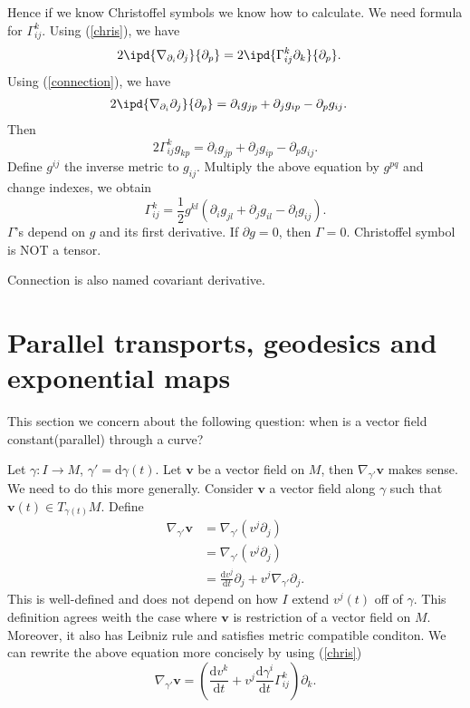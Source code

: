 Hence if we know Christoffel symbols we know how to calculate. We need formula for $\Gamma^k_{ij}$. Using (\ref{chris}), we have
\begin{align*}
  2\ipd{\nabla _{\partial_i}\partial_j}{\partial_p}&=2\ipd{\Gamma^k_{ij}\partial_k}{\partial_p}
.\end{align*}
Using (\ref{connection}), we have
\begin{align*}
  2\ipd{\nabla _{\partial_i}\partial_j}{\partial_p}&= \partial_i g_{jp}+\partial_j g_{ip}-\partial_p g_{ij}
.\end{align*}
Then
\[
2\Gamma_{ij}^{k} g_{kp}=\partial_{i}g_{jp}+\partial_{j}g_{ip}-\partial_pg_{ij}.
\] 
Define $g^{ij}$ the inverse metric to $g_{ij}$. Multiply the above equation by $g^{pq}$ and change indexes, we obtain
\begin{equation}
  \Gamma_{ij}^{k}=\frac{1}{2}g^{kl}\left( \partial_i g_{jl}+\partial_jg_{il}-\partial_l g_{ij} \right). 
\end{equation}
$\Gamma$'s depend on $g$ and its first derivative. If $\partial g=0$, then $\Gamma=0$.
Christoffel symbol is NOT a tensor.

Connection is also named covariant derivative.

\section{Parallel transports, geodesics and exponential maps}
This section we concern about the following question: when is a vector field constant(parallel) through a curve?

Let $\gamma:I\to M$, $\gamma'=\mathrm{d}\gamma(t)$. Let $\mathbf{v}$ be a vector field on $M$, then $\nabla _{\gamma'}\mathbf{v}$ makes sense. We need to do this more generally. Consider $\mathbf{v}$ a vector field along $\gamma$ such that $\mathbf{v}(t)\in T_{\gamma(t)}M$. Define 
\begin{align*}
  \nabla _{\gamma'}\mathbf{v}&= \nabla _{\gamma'}\left( v^j\partial_j \right) \\
  &= \nabla _{\gamma'}\left( v^j\partial_j \right) \\
  &= \frac{\mathrm{d}v^j}{\mathrm{d}t}\partial_j +v^j\nabla _{\gamma'}\partial_j
.\end{align*}
This is well-defined and does not depend on how $I$ extend $v^j(t)$ off of $\gamma$. This definition agrees weith the case where $\mathbf{v}$ is restriction of a vector field on $M$. Moreover, it also has Leibniz rule and satisfies metric compatible conditon. We can rewrite the above equation more concisely by using (\ref{chris})
\begin{equation}
  \nabla _{\gamma'}\mathbf{v}=\left( \frac{\mathrm{d}v^k}{\mathrm{d}t}+v^j \frac{\mathrm{d}\gamma^i}{\mathrm{d}t}\Gamma_{ij}^k \right) \partial_k.\label{auxi}
\end{equation}

